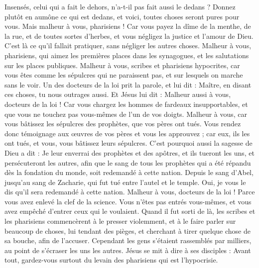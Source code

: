 \begin{multicols}{2}
{Insensés, celui qui a fait le dehors, n'a-t-il pas fait aussi le dedans ?
Donnez plutôt en aumône ce qui est dedans, et voici, toutes choses seront pures pour vous.
Mais malheur à vous, pharisiens ! Car vous payez la dîme de la menthe, de la rue, et de toutes sortes d’herbes, et vous négligez la justice et l'amour de Dieu. C’est là ce qu’il fallait pratiquer, sans négliger les autres choses.
Malheur à vous, pharisiens, qui aimez les premières places dans les synagogues, et les salutations sur les places publiques.
Malheur à vous, scribes et pharisiens hypocrites, car vous êtes comme les sépulcres qui ne paraissent pas, et sur lesquels on marche sans le voir.
Un des docteurs de la loi prit la parole, et lui dit : Maître, en disant ces choses, tu nous outrages aussi.
Et Jésus lui dit : Malheur aussi à vous, docteurs de la loi ! Car vous chargez les hommes de fardeaux insupportables, et que vous ne touchez pas vous-mêmes de l’un de vos doigts.
Malheur à vous, car vous bâtissez les sépulcres des prophètes, que vos pères ont tués.
Vous rendez donc témoignage aux œuvres de vos pères et vous les approuvez ; car eux, ils les ont tués, et vous, vous bâtissez leurs sépulcres.
C'est pourquoi aussi la sagesse de Dieu a dit : Je leur enverrai des prophètes et des apôtres, et ils tueront les uns, et persécuteront les autres,
afin que le sang de tous les prophètes qui a été répandu dès la fondation du monde, soit redemandé à cette nation.
Depuis le sang d'Abel, jusqu'au sang de Zacharie, qui fut tué entre l'autel et le temple. Oui, je vous le dis qu'il sera redemandé à cette nation.
Malheur à vous, docteurs de la loi ! Parce vous avez enlevé la clef de la science. Vous n'êtes pas entrés vous-mêmes, et vous avez empêché d’entrer ceux qui le voulaient.
Quand il fut sorti de là, les scribes et les pharisiens commencèrent à le presser violemment, et à le faire parler sur beaucoup de choses,
lui tendant des pièges, et cherchant à tirer quelque chose de sa bouche, afin de l’accuser.
\TextTitle{[grandeur]}
\VerseOne{}Cependant les gens s'étaient rassemblés par milliers, au point de s’écraser les uns les autres. Jésus se mit à dire à ses disciples : Avant tout, gardez-vous surtout du levain des pharisiens qui est l'hypocrisie.
}
\end{multicols}
